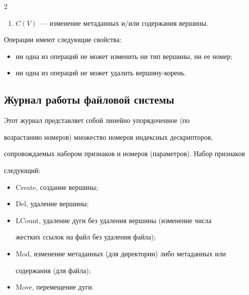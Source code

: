 \begin{multicols}{2}
\begin{enumerate}
размещается в директории~$V_3$.


\item $C(V)$~--- изменение метаданных и/или содержания вершины. 


\end{enumerate}


      


      Операции имеют следующие свойства:


      \begin{itemize}


\item ни одна из операций не может изменить ни тип вершины, ни ее номер;


\item ни одна из операций не может удалить вер\-ши\-ну-корень. 


\end{itemize}





\subsection{Журнал работы файловой системы}





      Этот журнал представляет собой линейно упорядоченное (по 


возрастанию номеров) множество номеров индексных дескрипторов, 


со\-про\-вож\-да\-емых набором признаков и номеров (параметров). Набор признаков 


следующий:


      \begin{itemize}


\item Create, создание вершины;


\item Del, удаление вершины;


\item LCount, удаление дуги без удаления вершины (изменение числа 


жестких ссылок на файл без удаления файла);


\item Mod, изменение метаданных (для директории) либо метаданных или 


содержания (для файла);


\item Move, перемещение дуги.



\end{itemize}
\end{multicols}
